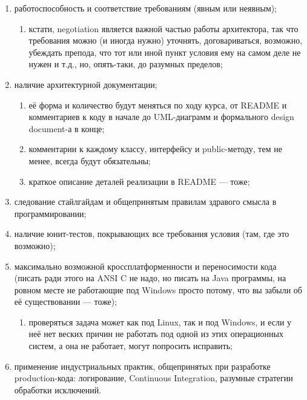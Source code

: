 \documentclass[a5paper]{article}
\begin{document}
\begin{enumerate}
    \item работоспособность и соответствие требованиям (явным или неявным);
  \begin{enumerate}
        \item кстати, negotiation является важной частью работы архитектора, так что требования можно (и иногда нужно) уточнять, договариваться, возможно, убеждать препода, что тот или иной пункт условия ему на самом деле не нужен и т.д., но, опять-таки, до разумных пределов;
  \end{enumerate}
    \item наличие архитектурной документации;
  \begin{enumerate}
        \item её форма и количество будут меняться по ходу курса, от README и комментариев к коду в начале до UML-диаграмм и формального design document-а в конце;
        \item комментарии к каждому классу, интерфейсу и public-методу, тем не менее, всегда будут обязательны;
        \item краткое описание деталей реализации в README --- тоже;
  \end{enumerate}
    \item следование стайлгайдам и общепринятым правилам здравого смысла в программировании;
    \item наличие юнит-тестов, покрывающих все требования условия (там, где это возможно);
    \item максимально возможной кроссплатформенности и переносимости кода (писать ради этого на ANSI C не надо, но писать на Java программы, на ровном месте не работающие под Windows просто потому, что вы забыли об её существовании --- тоже);
  \begin{enumerate}
        \item проверяться задача может как под Linux, так и под Windows, и если у неё нет веских причин не работать под одной из этих операционных систем, а она не работает, могут попросить исправить;
  \end{enumerate}
    \item применение индустриальных практик, общепринятых при разработке production-кода: логирование, Continuous Integration, разумные стратегии обработки исключений.
\end{enumerate}
\end{document}
